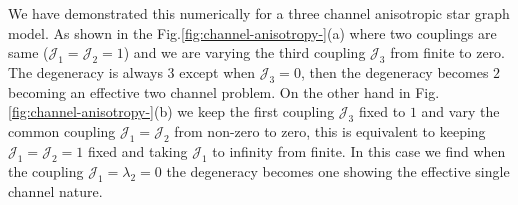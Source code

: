 \documentclass[reprint,prb,superscriptaddress]{revtex4-1}
\begin{document}
We have demonstrated this numerically for a three channel anisotropic star graph model. As shown in the Fig.\ref{fig:channel-anisotropy-}(a) where two couplings are same (${\mathcal{J}}_1={\mathcal{J}}_2=1$) and we are varying the third coupling ${\mathcal{J}}_3$ from finite to zero. The degeneracy is always $3$ except when ${\mathcal{J}}_3=0$, then the degeneracy becomes $2$ becoming an effective two channel problem. On the other hand in Fig.\ref{fig:channel-anisotropy-}(b) we keep the first coupling ${\mathcal{J}}_3$ fixed to $1$ and vary the common coupling ${\mathcal{J}}_1={\mathcal{J}}_2$ from non-zero to zero, this is equivalent to keeping ${\mathcal{J}}_1={\mathcal{J}}_2=1$ fixed and taking ${\mathcal{J}}_1$ to infinity from finite. In this case we find when the coupling ${\mathcal{J}}_1=\lambda_2=0$ the degeneracy becomes one showing the effective single channel nature.
\end{document}
